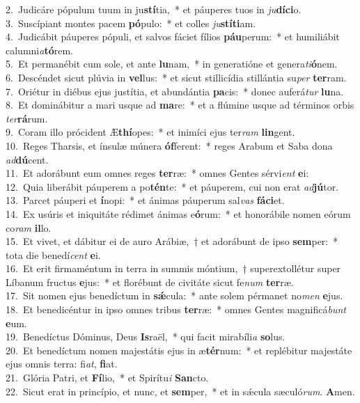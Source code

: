 {2.~}Judicáre pópulum tuum in ju\textbf{stí}tia,~* et páuperes tuos in \textit{ju}\textbf{dí}\textbf{ci}o.\\
{3.~}Suscípiant montes pacem \textbf{pó}pulo:~* et colles \textit{ju}\textbf{stí}\textbf{ti}am.\\
{4.~}Judicábit páuperes pópuli, et salvos fáciet fílios \textbf{páu}perum:~* et humiliábit calumni\textit{a}\textbf{tó}rem.\\
{5.~}Et permanébit cum sole, et ante \textbf{lu}nam,~* in generatióne et genera\textit{ti}\textbf{ó}nem.\\
{6.~}Descéndet sicut plúvia in \textbf{vel}lus:~* et sicut stillicídia stillántia su\textit{per} \textbf{ter}ram.\\
{7.~}Oriétur in diébus ejus justítia, et abundántia \textbf{pa}cis:~* donec auferá\textit{tur} \textbf{lu}na.\\
{8.~}Et dominábitur a mari usque ad \textbf{ma}re:~* et a flúmine usque ad términos orbis \textit{ter}\textbf{rá}rum.\\
{9.~}Coram illo prócident Æ\textbf{thí}opes:~* et inimíci ejus ter\textit{ram} \textbf{lin}gent.\\
{10.~}Reges Tharsis, et ínsulæ múnera \textbf{óf}ferent:~* reges Arabum et Saba dona \textit{ad}\textbf{dú}cent.\\
{11.~}Et adorábunt eum omnes reges \textbf{ter}ræ:~* omnes Gentes sérvi\textit{ent} \textbf{e}i:\\
{12.~}Quia liberábit páuperem a po\textbf{tén}te:~* et páuperem, cui non erat \textit{ad}\textbf{jú}tor.\\
{13.~}Parcet páuperi et \textbf{í}nopi:~* et ánimas páuperum sal\textit{vas} \textbf{fá}\textbf{ci}et.\\
{14.~}Ex usúris et iniquitáte rédimet ánimas e\textbf{ó}rum:~* et honorábile nomen eórum co\textit{ram} \textbf{il}lo.\\
{15.~}Et vivet, et dábitur ei de auro Arábiæ,~† et adorábunt de ipso \textbf{sem}per:~* tota die benedí\textit{cent} \textbf{e}i.\\
{16.~}Et erit firmaméntum in terra in summis móntium,~† superextollétur super Líbanum fructus \textbf{e}jus:~* et florébunt de civitáte sicut fe\textit{num} \textbf{ter}ræ.\\
{17.~}Sit nomen ejus benedíctum in \textbf{sǽ}cula:~* ante solem pérmanet no\textit{men} \textbf{e}jus.\\
{18.~}Et benedicéntur in ipso omnes tribus \textbf{ter}ræ:~* omnes Gentes magnificá\textit{bunt} \textbf{e}um.\\
{19.~}Benedíctus Dóminus, Deus \textbf{Is}raël,~* qui facit mirabíli\textit{a} \textbf{so}lus.\\
{20.~}Et benedíctum nomen majestátis ejus in æ\textbf{tér}num:~* et replébitur majestáte ejus omnis terra: fi\textit{at}, \textbf{fi}at.\\
{21.~}Glória Patri, et \textbf{Fí}lio,~* et Spirítu\textit{i} \textbf{San}cto.\\
{22.~}Sicut erat in princípio, et nunc, et \textbf{sem}per,~* et in sǽcula sæculó\textit{rum}. \textbf{A}men.\\
